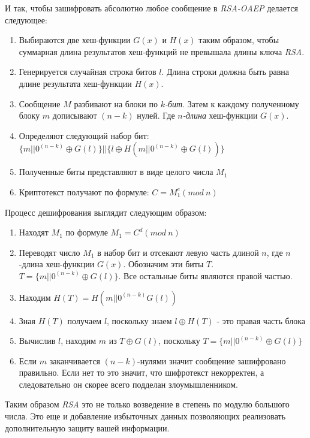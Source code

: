   И так, чтобы зашифровать абсолютно любое сообщение в \textit{RSA-OAEP} делается следующее:
    \begin{enumerate}
	    \item Выбираются две хеш-функции {$G(x)$} и {$H(x)$} таким образом, чтобы суммарная длина результатов хеш-функций не превышала длины 
	      ключа \textit{RSA}.
	    \item Генерируется случайная строка битов {$l$}. Длина строки должна быть равна длине результата хеш-функции {$H(x)$}.
	    \item Сообщение {$M$} разбивают на блоки по \textit{{$k$}-бит}. Затем к каждому полученному блоку {$m$} дописывают {$(n-k)$} нулей. 
	      Где \textit{{$n$}-длина} хеш-функции {$G(x)$}.
	    \item Определяют следующий набор бит: {$ \{m||0^{(n-k)} \oplus G(l)\}||\{l \oplus H(m||0^{(n-k)} \oplus G(l))\} $}
	    \item Полученные биты представляют в виде целого числа {$M_1$}
	    \item Криптотекст получают по формуле: {$ C=M_{1}^{e}(mod \: n) $}
    \end{enumerate}

  Процесс дешифрования выглядит следующим образом:
    \begin{enumerate}
	    \item Находят {$M_1$} по формуле \textit{$ M_{1}=C^{d}(mod \: n) $}
	    \item Переводят число $M_1$ в набор бит и отсекают левую часть длиной $n$, где {$n$}-длина 
	      хеш-функции {$G(x)$}. Обозначим эти биты {$T$}. {$T= \{m||0^{(n-k)} \oplus G(l)\} $}. Все 
	      остальные биты являются правой частью.
	    \item Находим {$ H(T)=H(m||0^{(n-k)} G(l)) $}
	    \item Зная {$H(T)$} получаем {$l$}, поскольку знаем {$l \oplus H(T)$} - это правая часть блока
	    \item Вычислив {$l$}, находим {$m$} из {$T \oplus G(l)$}, поскольку {$ T=\{m||0^{(n-k)} \oplus G(l)\} $}
	    \item Если {$m$} заканчивается {$(n-k)$}-нулями значит сообщение зашифровано правильно. Если нет то это значит, что шифротекст 
	      некорректен, а следовательно он скорее всего подделан злоумышленником.
    \end{enumerate}

  Таким образом \textit{RSA} это не только возведение в степень по модулю большого числа. Это еще и добавление избыточных данных позволяющих реализовать 
  дополнительную защиту вашей информации.

